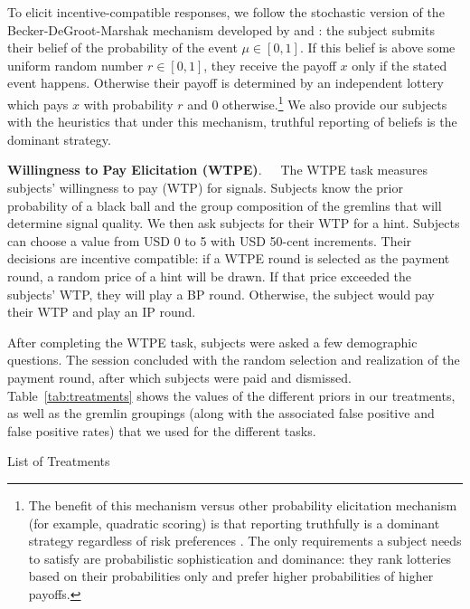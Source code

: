 \documentclass[12pt,a4paper]{article}
\begin{document}
To elicit incentive-compatible responses, we follow the stochastic version of the Becker-DeGroot-Marshak mechanism developed by \citet{grether_testing_1992} and \citet{holt_update_2009}: the subject submits their belief of the probability of the event $\mu \in [0,1]$. If this belief is above some uniform random number $r\in[0,1]$, they receive the payoff $x$ only if the stated event happens. Otherwise their payoff is determined by an independent lottery which pays $x$ with probability $r$ and 0 otherwise.\footnote{The benefit of this mechanism versus other probability elicitation mechanism (for example, quadratic scoring) is that reporting truthfully is a dominant strategy regardless of risk preferences \citep{karni_mechanism_2009-1}. The only requirements a subject needs to satisfy are probabilistic sophistication and dominance: they rank lotteries based on their probabilities only and prefer higher probabilities of higher payoffs.} We also provide our subjects with the heuristics that under this mechanism, truthful reporting of beliefs is the dominant strategy.

\bigskip
\noindent\textbf{Willingness to Pay Elicitation (WTPE)}.\ \ \ The WTPE task measures subjects' willingness to pay (WTP) for signals. Subjects know the prior probability of a black ball and the group composition of the gremlins that will determine signal quality.  We then ask subjects for their WTP for a hint. Subjects can choose a value from USD 0 to 5 with USD 50-cent increments. Their decisions are incentive compatible: if a WTPE round is selected as the payment round, a random price of a hint will be drawn. If that price exceeded the subjects' WTP, they will play a BP round. Otherwise, the subject would pay their WTP and play an IP round.  

\vspace{10pt} 

After completing the WTPE task, subjects were asked a few demographic questions. The session concluded with the random selection and realization of the payment round, after which subjects were paid and dismissed. Table~\ref{tab:treatments} shows the values of the different priors in our treatments, as well as the gremlin groupings (along with the associated false positive and false positive rates) that we used for the different tasks.

\begin{table}[h!]
\caption{List of Treatments} \label{tab:treatments}

\end{table}
\end{document}
